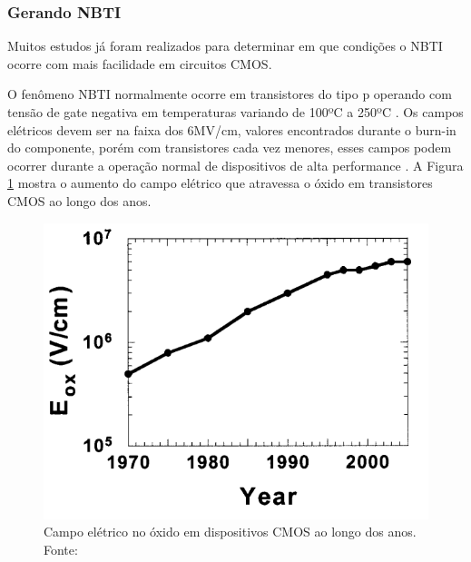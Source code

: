 \subsubsection{Gerando NBTI}
\label{sec:GerandoNbti}
Muitos estudos já foram realizados para determinar em que condições o NBTI ocorre com mais facilidade em circuitos CMOS.

O fenômeno NBTI normalmente ocorre em transistores do tipo p operando com tensão de gate negativa em temperaturas variando de 100ºC a 250ºC \cite{Davidovic}. Os campos elétricos devem ser na faixa dos 6MV/cm, valores encontrados durante o burn-in do componente, porém com transistores cada vez menores, esses campos podem ocorrer durante a operação normal de dispositivos de alta performance \cite{Schroder}. A Figura \ref{fig:CampoEletricoAno} mostra o aumento do campo elétrico que atravessa o óxido em transistores CMOS ao longo dos anos.

\begin{figure}[H]
    \centering
    \includegraphics[scale=0.5]{figures/ReferencialTeorico/CampoEletricoAno.png}
    \caption{Campo elétrico no óxido em dispositivos CMOS ao longo dos anos. Fonte: \cite{Schroder}}
    \label{fig:CampoEletricoAno}
\end{figure}


